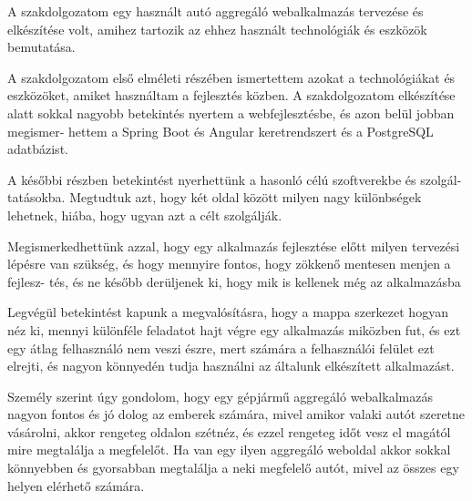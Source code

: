 
A szakdolgozatom egy használt autó aggregáló webalkalmazás tervezése és elkészítése volt, amihez tartozik az ehhez használt technológiák és eszközök bemutatása.

A szakdolgozatom első elméleti részében ismertettem azokat a technológiákat és eszközöket, amiket használtam a fejlesztés közben. A szakdolgozatom elkészítése alatt sokkal nagyobb betekintés nyertem a webfejlesztésbe, és azon belül jobban megismer-
hettem a Spring Boot és Angular keretrendszert és a PostgreSQL adatbázist.

A későbbi részben betekintést nyerhettünk a hasonló célú szoftverekbe és szolgál-
tatásokba. Megtudtuk azt, hogy két oldal között milyen nagy különbségek lehetnek, hiába, hogy ugyan azt a célt szolgálják.

Megismerkedhettünk azzal, hogy egy alkalmazás fejlesztése előtt milyen tervezési lépésre van szükség, és hogy mennyire fontos, hogy zökkenő mentesen menjen a fejlesz-
tés, és ne később derüljenek ki, hogy mik is kellenek még az alkalmazásba

Legvégül betekintést kapunk a megvalósításra, hogy a mappa szerkezet hogyan néz ki, mennyi különféle feladatot hajt végre egy alkalmazás miközben fut, és ezt egy átlag felhasználó nem veszi észre, mert számára a felhasználói felület ezt elrejti, és nagyon könnyedén tudja használni az általunk elkészített alkalmazást.

Személy szerint úgy gondolom, hogy egy gépjármű aggregáló webalkalmazás nagyon fontos és jó dolog az emberek számára, mivel amikor valaki autót szeretne vásárolni, akkor rengeteg oldalon szétnéz, és ezzel rengeteg időt vesz el magától mire megtalálja a megfelelőt. Ha van egy ilyen aggregáló weboldal akkor sokkal könnyebben és gyorsabban megtalálja a neki megfelelő autót, mivel az összes egy helyen elérhető számára. 
